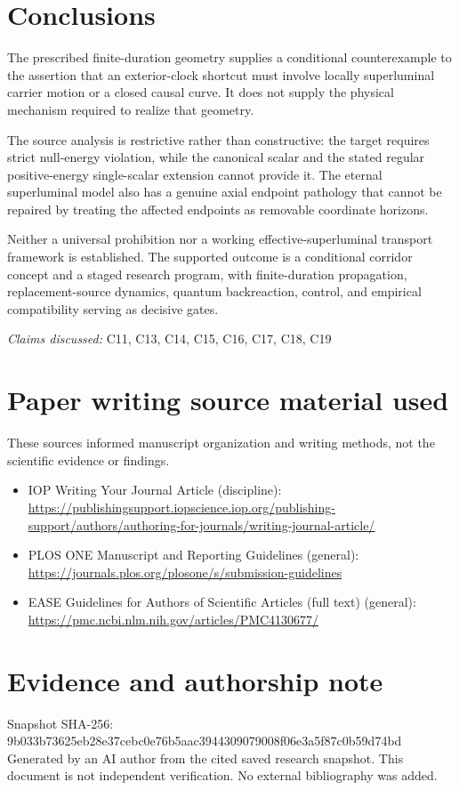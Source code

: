 \documentclass[11pt]{article}
\begin{document}
\section{Conclusions}
The prescribed finite-duration geometry supplies a conditional counterexample to the assertion that an exterior-clock shortcut must involve locally superluminal carrier motion or a closed causal curve. It does not supply the physical mechanism required to realize that geometry.

The source analysis is restrictive rather than constructive: the target requires strict null-energy violation, while the canonical scalar and the stated regular positive-energy single-scalar extension cannot provide it. The eternal superluminal model also has a genuine axial endpoint pathology that cannot be repaired by treating the affected endpoints as removable coordinate horizons.

Neither a universal prohibition nor a working effective-superluminal transport framework is established. The supported outcome is a conditional corridor concept and a staged research program, with finite-duration propagation, replacement-source dynamics, quantum backreaction, control, and empirical compatibility serving as decisive gates.

\textit{Claims discussed: }C11, C13, C14, C15, C16, C17, C18, C19
\section*{Paper writing source material used}
These sources informed manuscript organization and writing methods, not the scientific evidence or findings.
\begin{itemize}
\item IOP \textemdash{} Writing Your Journal Article (discipline): \url{https://publishingsupport.iopscience.iop.org/publishing-support/authors/authoring-for-journals/writing-journal-article/}
\item PLOS ONE \textemdash{} Manuscript and Reporting Guidelines (general): \url{https://journals.plos.org/plosone/s/submission-guidelines}
\item EASE \textemdash{} Guidelines for Authors of Scientific Articles (full text) (general): \url{https://pmc.ncbi.nlm.nih.gov/articles/PMC4130677/}
\end{itemize}
\section*{Evidence and authorship note}
Snapshot SHA-256: 9b033b73625eb28e37cebc0e76b5aac3944309079008f06e3a5f87c0b59d74bd
Generated by an AI author from the cited saved research snapshot. This document is not independent verification. No external bibliography was added.
\end{document}
